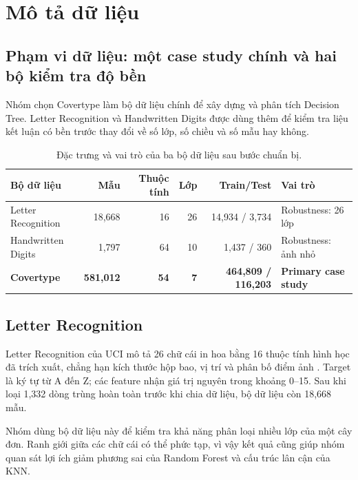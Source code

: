 \chapter{Mô tả dữ liệu}

\section{Phạm vi dữ liệu: một case study chính và hai bộ kiểm tra độ bền}

Nhóm chọn Covertype làm bộ dữ liệu chính để xây dựng và phân tích Decision Tree. Letter Recognition và Handwritten Digits được dùng thêm để kiểm tra liệu kết luận có bền trước thay đổi về số lớp, số chiều và số mẫu hay không.

\begin{table}[H]
    \centering
    \small
    \caption[Đặc trưng của ba bộ dữ liệu]{Đặc trưng và vai trò của ba bộ dữ liệu sau bước chuẩn bị.}
    \label{tab:dataset-summary}
    \begin{tabularx}{\textwidth}{@{}>{\raggedright\arraybackslash}Xrrrr>{\raggedright\arraybackslash}X@{}}
        \toprule
        \textbf{Bộ dữ liệu} & \textbf{Mẫu} & \textbf{Thuộc tính} & \textbf{Lớp} & \textbf{Train/Test} & \textbf{Vai trò} \\
        \midrule
        Letter Recognition & 18,668 & 16 & 26 & 14,934 / 3,734 & Robustness: 26 lớp \\
        Handwritten Digits & 1,797 & 64 & 10 & 1,437 / 360 & Robustness: ảnh nhỏ \\
        \textbf{Covertype} & \textbf{581,012} & \textbf{54} & \textbf{7} & \textbf{464,809 / 116,203} & \textbf{Primary case study} \\
        \bottomrule
    \end{tabularx}
\end{table}

\section{Letter Recognition}

Letter Recognition của UCI mô tả 26 chữ cái in hoa bằng 16 thuộc tính hình học đã trích xuất, chẳng hạn kích thước hộp bao, vị trí và phân bố điểm ảnh \cite{slate1991letter}. Target là ký tự từ A đến Z; các feature nhận giá trị nguyên trong khoảng 0--15. Sau khi loại 1,332 dòng trùng hoàn toàn trước khi chia dữ liệu, bộ dữ liệu còn 18,668 mẫu.

Nhóm dùng bộ dữ liệu này để kiểm tra khả năng phân loại nhiều lớp của một cây đơn. Ranh giới giữa các chữ cái có thể phức tạp, vì vậy kết quả cũng giúp nhóm quan sát lợi ích giảm phương sai của Random Forest và cấu trúc lân cận của KNN.

